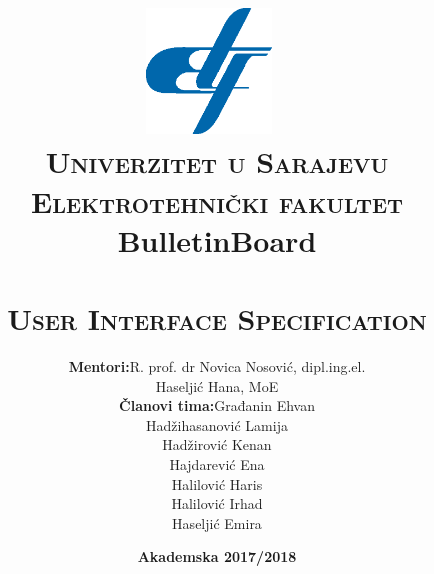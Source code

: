 \documentclass{article}
\title{
{
    \includegraphics[width=0.25\textwidth]{SRS/slike/logo.png}~\\[0.1cm]
    \textsc{\Large Univerzitet u Sarajevu}\\[0.2cm]  
    \textsc{\Large Elektrotehnički fakultet} \\[0.5cm] 
    \huge \bfseries BulletinBoard} \\[0.4cm] 
    \breakline \\[0.5cm]
    \textsc{\Large User Interface Specification}\\[0.4cm]
    }
\author{\begin{tabular}{rl}
  \textbf{Mentori:} & R. prof. dr Novica Nosović, dipl.ing.el. \\ &
                    Haseljić Hana, MoE \\
  \textbf{Članovi tima:} & Građanin Ehvan \\ 
                        & Hadžihasanović Lamija \\ 
                        & Hadžirović Kenan \\ 
                        & Hajdarević Ena \\ 
                        & Halilović Haris \\ 
                        & Halilović Irhad \\ 
                        & Haseljić Emira
\end{tabular}}
\date{\textbf{Akademska 2017/2018}}
\begin{document}
\maketitle
\newpage
\renewcommand{\contentsname}{Sadržaj}
\tableofcontents
\newpage


\newpage


\end{document}
